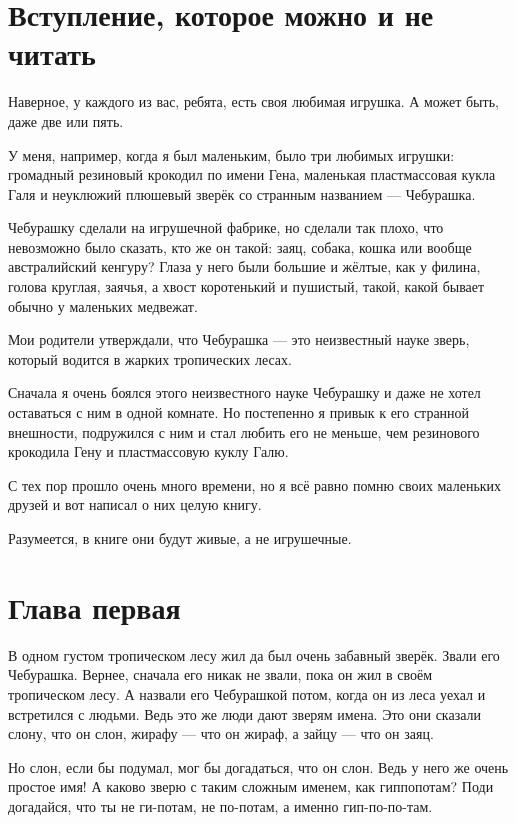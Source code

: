 \section{Вступление, которое можно и не читать}

Наверное, у каждого из вас, ребята, есть своя любимая игрушка. А может быть, даже две или пять.

У меня, например, когда я был маленьким, было три любимых игрушки: громадный резиновый крокодил по имени Гена, маленькая пластмассовая кукла Галя и неуклюжий плюшевый зверёк со странным названием — Чебурашка.

Чебурашку сделали на игрушечной фабрике, но сделали так плохо, что невозможно было сказать, кто же он такой: заяц, собака, кошка или вообще австралийский кенгуру? Глаза у него были большие и жёлтые, как у филина, голова круглая, заячья, а хвост коротенький и пушистый, такой, какой бывает обычно у маленьких медвежат.

Мои родители утверждали, что Чебурашка — это неизвестный науке зверь, который водится в жарких тропических лесах.

Сначала я очень боялся этого неизвестного науке Чебурашку и даже не хотел оставаться с ним в одной комнате. Но постепенно я привык к его странной внешности, подружился с ним и стал любить его не меньше, чем резинового крокодила Гену и пластмассовую куклу Галю.

С тех пор прошло очень много времени, но я всё равно помню своих маленьких друзей и вот написал о них целую книгу.

Разумеется, в книге они будут живые, а не игрушечные.

\section{Глава первая}

В одном густом тропическом лесу жил да был очень забавный зверёк. Звали его Чебурашка. Вернее, сначала его никак не звали, пока он жил в своём тропическом лесу. А назвали его Чебурашкой потом, когда он из леса уехал и встретился с людьми. Ведь это же люди дают зверям имена. Это они сказали слону, что он слон, жирафу — что он жираф, а зайцу — что он заяц.

Но слон, если бы подумал, мог бы догадаться, что он слон. Ведь у него же очень простое имя! А каково зверю с таким сложным именем, как гиппопотам? Поди догадайся, что ты не ги-потам, не по-потам, а именно гип-по-по-там.

